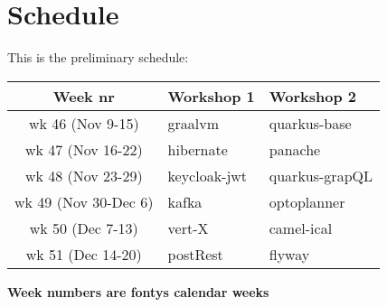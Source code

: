 \clearpage
\section*{Schedule}

This is the preliminary schedule:

\begin{center}
  \begin{tabular}{|c|l|l|}\hline
    \textbf{Week nr}& \textbf{Workshop 1}& \textbf{Workshop 2}\\\hline
    wk 46 (Nov 9-15)& graalvm & quarkus-base\\\hline
    wk 47 (Nov 16-22)& hibernate & panache\\\hline
    wk 48 (Nov 23-29)& keycloak-jwt & quarkus-grapQL\\\hline
    wk 49 (Nov 30-Dec 6)& kafka & optoplanner\\\hline
    wk 50 (Dec 7-13)& vert-X & camel-ical \\\hline
    wk 51 (Dec 14-20)& postRest & flyway \\\hline
  \end{tabular}
\end{center}

\textbf{Week numbers are fontys calendar weeks}


